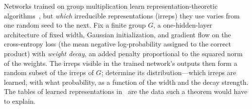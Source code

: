 \begin{openproblem}
Networks trained on group multiplication learn representation-theoretic algorithms~\cite{nanda2023,chughtai2023}, but \emph{which} irreducible representations (irreps) they use varies from one random seed to the next. Fix a finite group $G$, a one-hidden-layer architecture of fixed width, Gaussian initialization, and gradient flow on the cross-entropy loss (the mean negative log-probability assigned to the correct product) with \emph{weight decay}, an added penalty proportional to the squared norm of the weights. The irreps visible in the trained network's outputs then form a random subset of the irreps of $G$; determine its distribution---which irreps are learned, with what probability, as a function of the width and the decay strength. The tables of learned representations in~\cite{chughtai2023} are the data such a theorem would have to explain.
\end{openproblem}

